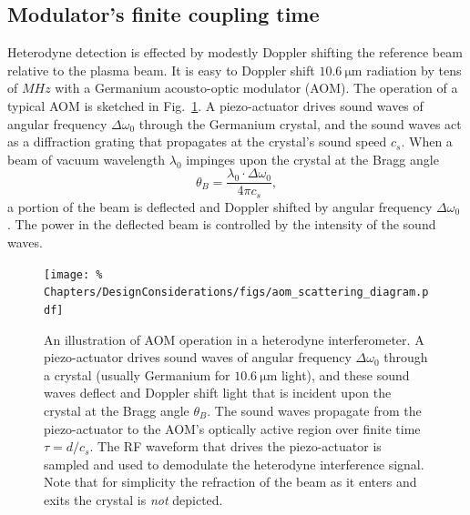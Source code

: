 \subsection{Modulator's finite coupling time}
Heterodyne detection is effected by
modestly Doppler shifting the reference beam
relative to the plasma beam.
It is easy to Doppler shift $\SI{10.6}{\micro\meter}$ radiation
by tens of $MHz$ with a Germanium acousto-optic modulator (AOM).
The operation of a typical AOM is sketched in
Fig.~\ref{fig:DesignConsiderations:aom_scattering_diagram}.
A piezo-actuator drives sound waves
of angular frequency $\Delta \omega_0$
through the Germanium crystal, and
the sound waves act as a diffraction grating
that propagates at the crystal's sound speed $c_s$.
When a beam of vacuum wavelength $\lambda_0$
impinges upon the crystal at the Bragg angle
\graffito{\textcolor{red}{comment about Bragg regime criterion from Ch.~2?}}
\begin{equation}
  \theta_B = \frac{\lambda_0 \cdot \Delta \omega_0}{4 \pi c_s},
  \label{eq:DesignConsiderations:Bragg_angle}
\end{equation}
a portion of the beam is deflected and
Doppler shifted by angular frequency $\Delta \omega_0$
\cite[Sec.~20.1]{saleh_and_teich}.
The power in the deflected beam
is controlled by the intensity of the sound waves.

\begin{figure}
  \centering
  \texttt{[image: \%
    Chapters/DesignConsiderations/figs/aom\_scattering\_diagram.pdf]}
  \caption[Illustration of AOM operation in a heterodyne interferometer]{%
    An illustration of AOM operation in a heterodyne interferometer.
    A piezo-actuator drives sound waves of angular frequency $\Delta \omega_0$
    through a crystal (usually Germanium for $\SI{10.6}{\micro\meter}$ light),
    and these sound waves deflect and Doppler shift light
    that is incident upon the crystal at the Bragg angle $\theta_B$.
    The sound waves propagate from the piezo-actuator
    to the AOM's optically active region
    over finite time $\tau = d / c_s$.
    The RF waveform that drives the piezo-actuator
    is sampled and used to demodulate the heterodyne interference signal.
    Note that for simplicity the refraction of the beam
    as it enters and exits the crystal is \emph{not} depicted.}
\label{fig:DesignConsiderations:aom_scattering_diagram}
\end{figure}

